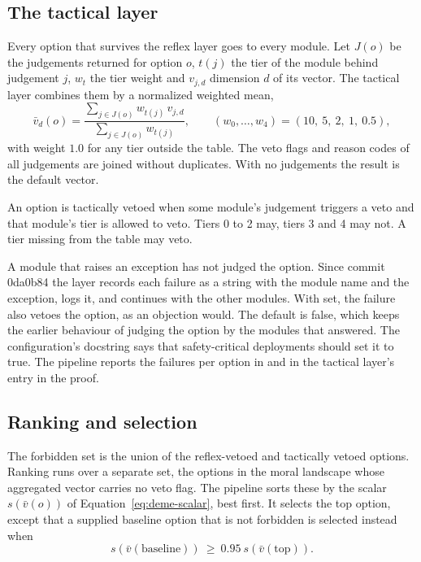\subsection{The tactical layer}

Every option that survives the reflex layer goes to every module. Let $J(o)$ be the judgements
returned for option $o$, $t(j)$ the tier of the module behind judgement $j$, $w_t$ the tier
weight and $v_{j,d}$ dimension $d$ of its vector. The tactical layer combines them by a
normalized weighted mean,
\begin{equation}
\bar v_d(o) = \frac{\sum_{j \in J(o)} w_{t(j)}\, v_{j,d}}{\sum_{j \in J(o)} w_{t(j)}},
\qquad
(w_0,\dots,w_4) = (10,\ 5,\ 2,\ 1,\ 0.5),
\label{eq:deme-aggregate}
\end{equation}
with weight $1.0$ for any tier outside the table. The veto flags and reason codes of all
judgements are joined without duplicates. With no judgements the result is the default vector.

An option is tactically vetoed when some module's judgement triggers a veto and that module's
tier is allowed to veto. Tiers 0 to 2 may, tiers 3 and 4 may not. A tier missing from the table
may veto.

A module that raises an exception has not judged the option. Since commit 0da0b84 the layer
records each failure as a string with the module name and the exception, logs it, and continues
with the other modules. With  set, the failure also vetoes the option, as an
objection would. The default is false, which keeps the earlier behaviour of judging the option
by the modules that answered. The configuration's docstring says that safety-critical
deployments should set it to true. The pipeline reports the failures per option in
 and in the tactical layer's entry in the proof.

\subsection{Ranking and selection}

The forbidden set is the union of the reflex-vetoed and tactically vetoed options. Ranking runs
over a separate set, the options in the moral landscape whose aggregated vector carries no veto
flag. The pipeline sorts these by the scalar $s(\bar v(o))$ of
Equation~\eqref{eq:deme-scalar}, best first. It selects the top option, except that a supplied
baseline option that is not forbidden is selected instead when
\begin{equation}
s(\bar v(\text{baseline})) \ \ge\ 0.95\ s(\bar v(\text{top})).
\label{eq:deme-baseline}
\end{equation}


